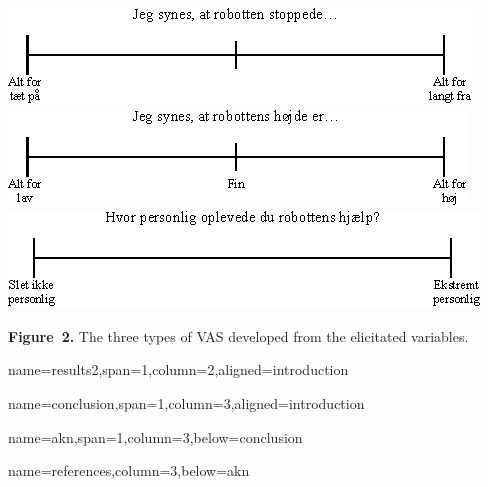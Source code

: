 \documentclass[paperwidth=160cm,paperheight=100cm,landscape,fontscale=0.3010]{baposter}
\begin{document}
\begin{poster}
{\begin{center}
	\includegraphics[width=0.7\linewidth]{TilpassetRStoppede.eps}
	\includegraphics[width=0.7\linewidth]{TilpassetHoejdeR.eps}
	\includegraphics[width=0.7\linewidth]{TilpassetPersonligHjaelp.eps}

	\textbf{Figure~2. }The three types of VAS developed from the elicitated variables.
\end{center}
\vspace{-10pt}
}



{name=results2,span=1,column=2,aligned=introduction}
{\parskip 5pt


}


{name=conclusion,span=1,column=3,aligned=introduction}
{\parskip 5pt

}


{name=akn,span=1,column=3,below=conclusion}
{\parskip 5pt

}


{name=references,column=3,below=akn}
{
\renewcommand{\section}[2]{}%
\footnotesize
}



\end{poster}
\end{document}
